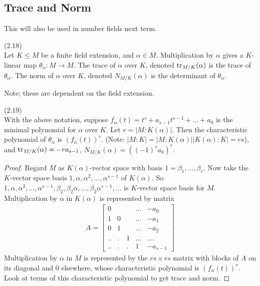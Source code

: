 \documentclass[a4paper]{article}
\begin{document}
\subsection{Trace and Norm}
This will also be used in number fields next term.

\begin{defi} (2.18)\\
Let $K \leq M$ be a finite field extension, and $\alpha \in M$. Multiplication by $\alpha$ gives a $K$-linear map $\theta_\alpha: M \to M$. The trace of $\alpha$ over $K$, denoted $\operatorname{tr}_{M/K} (\alpha)$ is the trace of $\theta_\alpha$. The norm of $\alpha$ over $K$, denoted $N_{M/K}(\alpha)$ is the determinant of $\theta_\alpha$.

Note; these are dependent on the field extension.
\end{defi}

\begin{thm} (2.19)\\
With the above notation, suppose $f_\alpha(t) = t^s+a_{s-1}t^{s-1}+...+a_0$ is the minimal polynomial for $\alpha$ over $K$. Let $r = |M:K(\alpha)|$. Then the characteristic polynomial of $\theta_\alpha$ is $(f_\alpha(t))^r$. (Note: $|M:K| = |M:K(\alpha)| |K(\alpha):K| = rs$), and $\operatorname{tr}_{M/K} (\alpha) = -ra_{s-1}$, $N_{M/K} (\alpha) = ((-1)^s a_0)^r$.
\begin{proof}
Regard $M$ as $K(\alpha)$-vector space with basis $1=\beta_1,...,\beta_r$. Now take the $K$-vector space basis $1,\alpha,\alpha^2,...,\alpha^{s-1}$ of $K(\alpha)$. So $1,\alpha,\alpha^2,...,\alpha^{s-1},\beta_2,\beta_2\alpha,...,\beta_2\alpha^{s-1},...$ is $K$-vector space basis for $M$. Multiplication by $\alpha$ in $K(\alpha)$ is represented by matrix
\begin{equation*}
\begin{aligned}
A = \begin{bmatrix}
0 & & & ... & -a_0\\
1 &0& & ... & -a_1\\
0 &1& & ... & -a_2\\
..&.&1& ... & ....\\
..&.&.& 1   & -a_{s-1}
\end{bmatrix}
\end{aligned}
\end{equation*}
Multiplication by $\alpha$ in $M$ is represented by the $rs\times rs$ matrix with blocks of $A$ on its diagonal and $0$ elsewhere, whose characteristic polynomial is $(f_\alpha(t))^r$. Look at terms of this characteristic polynomial to get trace and norm.
\end{proof}
\end{thm}
\end{document}
